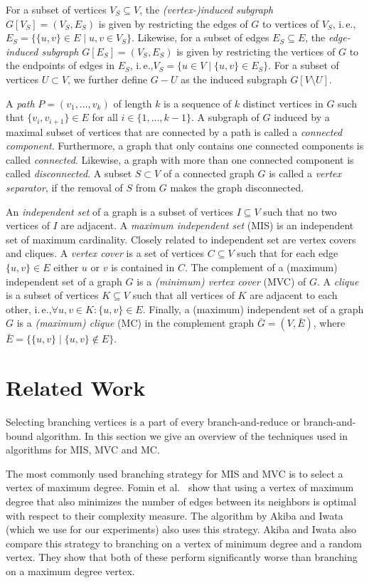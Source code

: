 \documentclass[a4paper,UKenglish,cleveref, autoref, thm-restate]{lipics-v2021}
\newcommand{\ie}{i.\,e.,\xspace}
\begin{document}
For a subset of vertices $V_S \subseteq V$, the \emph{(vertex-)induced subgraph}
$G[V_S] = (V_S, E_S)$ is given by restricting the edges of $G$ to vertices of $V_S$, \ie $E_S = \{\{u,v\} \in E \mid u,v \in V_S\}$.
Likewise, for a subset of edges $E_S \subseteq E$, the \emph{edge-induced
  subgraph} $G[E_S] = (V_S, E_S)$ is given by restricting the vertices of $G$ to the endpoints of edges in $E_S$, \ie $V_S = \{u \in V \mid \{u,v\} \in E_S\}$.
  For a subset of vertices $U \subset V$, we further define $G - U$ as the induced subgraph $G[V \setminus U]$.

A \emph{path} $P=(v_1, \ldots, v_k)$ of length $k$ is a sequence of $k$ distinct vertices in $G$ such that $\{v_i, v_{i+1}\} \in E$ for all $i \in \{1, \ldots, k-1\}$.
A subgraph of $G$ induced by a maximal subset of vertices that are connected by a path is called a \emph{connected component}.
Furthermore, a graph that only contains one connected components is called \emph{connected}.
Likewise, a graph with more than one connected component is called \emph{disconnected}.
A subset $S \subset V$ of a connected graph $G$ is called a \emph{vertex separator}, if the removal of $S$ from $G$ makes the graph disconnected.

An \emph{independent set} of a graph is a subset of vertices $I \subseteq V$ such that no two vertices of $I$ are adjacent. 
A \emph{maximum independent set} (MIS) is an independent set of maximum cardinality.
Closely related to independent set are vertex covers and cliques.
A \emph{vertex cover} is a set of vertices $C \subseteq V$ such that for each edge $\{u,v\} \in E$ either $u$ or $v$ is contained in $C$.
The complement of a (maximum) independent set of a graph $G$ is a \emph{(minimum) vertex cover} (MVC) of $G$.
A \emph{clique} is a subset of vertices $K \subseteq V$ such that all vertices of $K$ are adjacent to each other, \ie $\forall u,v \in K: \{u,v\} \in E$.
Finally, a (maximum) independent set of a graph $G$ is a \emph{(maximum) clique} (MC) in the complement graph $\bar{G} = (V, \bar{E})$, where $\bar{E} = \{\{u,v\} \mid \{u,v\} \not\in E\}$.

\section{Related Work}
Selecting branching vertices is a part of every branch-and-reduce or
branch-and-bound algorithm. In this section we give an overview of the techniques used in
algorithms for MIS, MVC and MC.

The most commonly used branching strategy for MIS and MVC is to select a vertex
of maximum degree. Fomin et al.~\cite{Fomin} show that using a vertex of maximum
degree that also minimizes the number of edges between its neighbors is optimal
with respect to their complexity measure. The algorithm by Akiba and Iwata~\cite{AkibaIwata}
(which we use for our experiments) also uses this strategy. Akiba and Iwata also
compare this strategy to branching on a vertex of minimum degree and a random
vertex. They show that both of these perform significantly worse than branching
on a maximum degree vertex.
\end{document}
